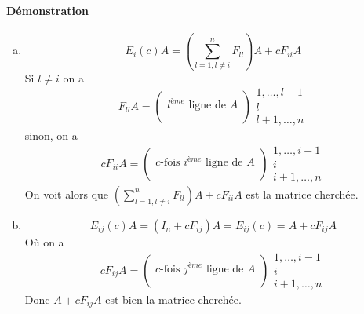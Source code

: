 \paragraph{Démonstration}
\begin{enumerate}[a)]
  \item $$E_i(c) A = \left( \sum_{l=1, l\neq i}^n F_{ll} \right) A +  c F_{ii} A$$
    Si $l\neq i$ on a
    $$F_{ll} A =
      \begin{pmatrix}
        \\
        l^{ème} \text{ ligne de } A \\
        \\
      \end{pmatrix} \begin{array}{c} 1, \ldots, l-1 \\ l \\ l+1, \ldots, n \end{array}$$
    sinon, on a
    $$c F_{ii} A =
      \begin{pmatrix}
        \\
        c\text{-fois } i^{ème} \text{ ligne de } A \\
        \\
      \end{pmatrix} \begin{array}{c} 1, \ldots, i-1 \\ i \\ i+1, \ldots, n \end{array}$$
    On voit alors que $\left( \sum_{l=1, l\neq i}^n F_{ll} \right) A +  c F_{ii} A$ est la matrice cherchée.
    
  \item $$E_{ij}(c) A = (I_n + c F_{ij}) A = E_{ij}(c) = A + c F_{ij} A$$
    Où on a
      $$c F_{ij} A =
    \begin{pmatrix}
      \\
      c\text{-fois } j^{ème} \text{ ligne de } A \\
      \\
    \end{pmatrix} \begin{array}{c} 1, \ldots, i-1 \\ i \\ i+1, \ldots, n \end{array}$$
    Donc $A + c F_{ij} A$ est bien la matrice cherchée.
    

\end{enumerate}
